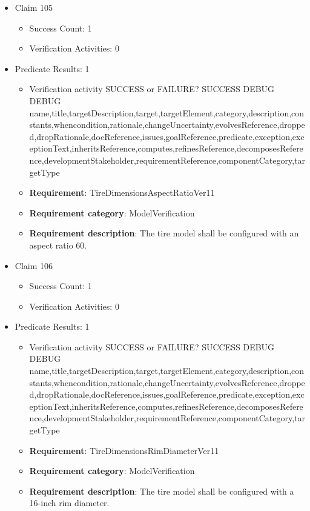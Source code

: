 \documentclass{article}
\begin{document}
\begin{itemize}
  				  \item Claim 105
				\begin{itemize}
			    	\item Success Count: 1 
			    	\item Verification Activities: 0
				\end{itemize}
				
									    
				\item Predicate Results: 1
					\begin{itemize}				
					\item Verification activity SUCCESS or FAILURE? SUCCESS
					DEBUG DEBUG name,title,targetDescription,target,targetElement,category,description,constants,whencondition,rationale,changeUncertainty,evolvesReference,dropped,dropRationale,docReference,issues,goalReference,predicate,exception,exceptionText,inheritsReference,computes,refinesReference,decomposesReference,developmentStakeholder,requirementReference,componentCategory,targetType
					\item \textbf{Requirement}: TireDimensionsAspectRatioVer11 
					\item \textbf{Requirement category}: ModelVerification
					\item \textbf{Requirement description}: The tire model shall be configured with an aspect ratio 60.
					\end{itemize}

  				  \item Claim 106
				\begin{itemize}
			    	\item Success Count: 1 
			    	\item Verification Activities: 0
				\end{itemize}
				
									    
				\item Predicate Results: 1
					\begin{itemize}				
					\item Verification activity SUCCESS or FAILURE? SUCCESS
					DEBUG DEBUG name,title,targetDescription,target,targetElement,category,description,constants,whencondition,rationale,changeUncertainty,evolvesReference,dropped,dropRationale,docReference,issues,goalReference,predicate,exception,exceptionText,inheritsReference,computes,refinesReference,decomposesReference,developmentStakeholder,requirementReference,componentCategory,targetType
					\item \textbf{Requirement}: TireDimensionsRimDiameterVer11 
					\item \textbf{Requirement category}: ModelVerification
					\item \textbf{Requirement description}: The tire model shall be configured with a 16-inch rim diameter.
					\end{itemize}


\end{itemize}
\end{document}
